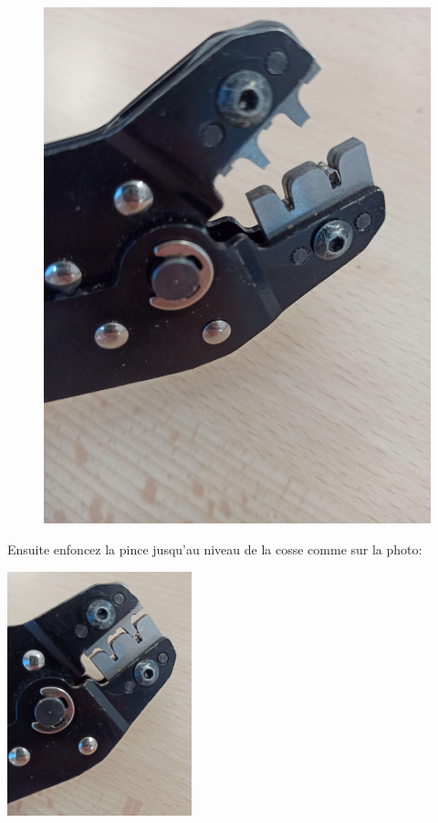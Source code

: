 \documentclass{article}
\begin{document}
\begin{figure}[h]
\begin{minipage}{0.45\textwidth}
        \includegraphics[width=\linewidth]{images/cosse_dans_pince_sertir.jpg}
        \captionsetup{labelformat=empty}
        \caption{}
        \label{fig:image2}
    \end{minipage}
\end{figure}

\newpage
Ensuite enfoncez la pince jusqu'au niveau de la cosse comme sur la photo:

\begin{minipage}{\textwidth}
    \vspace{0.5cm}
    \begin{center}
    \includegraphics[width=0.4\textwidth]{images/fixer_cosse_dans_pince_sertir.jpg}
    \captionsetup{labelformat=empty}
    \end{center}
    \vspace{0.5cm}
\end{minipage}
\end{document}
